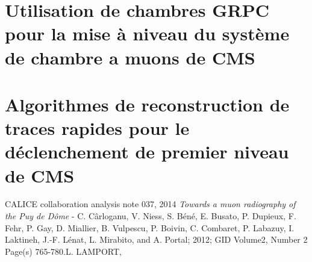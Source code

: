 \documentclass[9pt,french]{article}
\begin{document}
\section*{Utilisation de chambres GRPC pour la mise \`a niveau du syst\`eme de chambre a muons de CMS}



\section*{Algorithmes de reconstruction de traces rapides pour le d\'eclenchement de premier niveau de CMS} 

\begin{thebibliography}{2}
    CALICE collaboration analysis note 037, 2014 
    {\it Towards a muon radiography of the Puy de Dôme} - C. Cârloganu, V. Niess, S. Béné, E. Busato, P. Dupieux, F. Fehr, P. Gay, D. Miallier, B. Vulpescu, P. Boivin, C. Combaret, P. Labazuy, I. Laktineh, J.-F. Lénat, L. Mirabito, and A. Portal; 2012; GID Volume2, Number 2 Page(s) 765-780.L. LAMPORT, 
   
\end{thebibliography}
\end{document}
